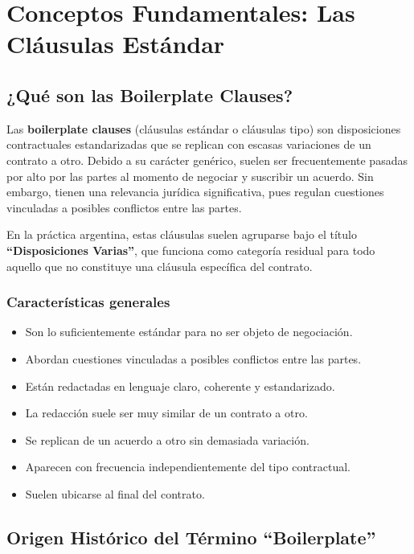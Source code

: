 \documentclass[12pt,oneside]{book}
\begin{document}
\chapter{Conceptos Fundamentales: Las Cláusulas Estándar}

\section{¿Qué son las Boilerplate Clauses?}

Las \textbf{boilerplate clauses} (cláusulas estándar o cláusulas tipo) son
disposiciones contractuales estandarizadas que se replican con escasas
variaciones de un contrato a otro. Debido a su carácter genérico, suelen
ser frecuentemente pasadas por alto por las partes al momento de negociar y
suscribir un acuerdo. Sin embargo, tienen una relevancia jurídica
significativa, pues regulan cuestiones vinculadas a posibles conflictos
entre las partes.

En la práctica argentina, estas cláusulas suelen agruparse bajo el título
\textbf{``Disposiciones Varias''}, que funciona como categoría residual
para todo aquello que no constituye una cláusula específica del contrato.

\subsection{Características generales}

\begin{itemize}
    \item Son lo suficientemente estándar para no ser objeto de negociación.
    \item Abordan cuestiones vinculadas a posibles conflictos entre las partes.
    \item Están redactadas en lenguaje claro, coherente y estandarizado.
    \item La redacción suele ser muy similar de un contrato a otro.
    \item Se replican de un acuerdo a otro sin demasiada variación.
    \item Aparecen con frecuencia independientemente del tipo contractual.
    \item Suelen ubicarse al final del contrato.
\end{itemize}

\section{Origen Histórico del Término ``Boilerplate''}
\end{document}
